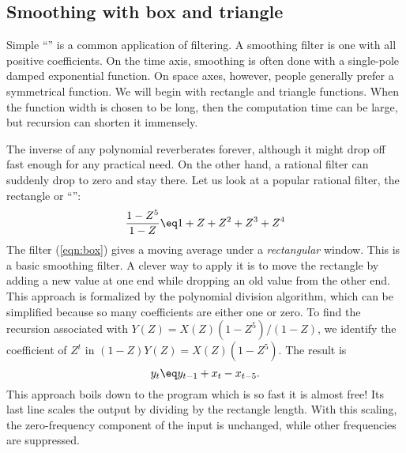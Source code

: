 \subsection{Smoothing with box and triangle}
%
Simple ``'' is a common application of filtering.  A
smoothing filter is one with all positive coefficients.  On the time
axis, smoothing is often done with a single-pole damped exponential
function.  On space axes, however, people generally prefer a
symmetrical function.  We will begin with rectangle and triangle
functions. When the function width is chosen to be long, then the
computation time can be large, but recursion can shorten it
immensely. 
%
\par
%
The inverse of any polynomial reverberates forever, although it might
drop off fast enough for any practical need.  On the other hand, a
rational filter can suddenly drop to zero and stay there.  Let us look
at a popular rational filter, the rectangle or ``'': 
\begin{equation}
{ \frac{1- Z^5}{ 1-Z} } \eq 1+Z+Z^2+Z^3+Z^4	\label{eqn:box}
\end{equation}
The filter (\ref{eqn:box}) gives a moving average under a {\em
rectangular} window.  This is a basic smoothing filter.  A clever
way to apply it is to move the rectangle by adding a new value at one
end while dropping an old value from the other end.  This approach is
formalized by the polynomial division algorithm, which can be
simplified because so many coefficients are either one or zero.  To
find the recursion associated with $Y(Z)= X(Z)(1-Z^5)/(1-Z)$, we
identify the coefficient of $Z^t$ in $(1-Z)Y(Z)= X(Z)(1-Z^5)$.  The
result is 
\begin{equation}
y_t \eq  y_{t-1} + x_t - x_{t-5}.
\end{equation}
This approach boils down to the program %
which is so fast it is almost free!
Its last line scales the output by dividing by the rectangle length.
With this scaling, the zero-frequency component of the input is
unchanged, while other frequencies are suppressed. 

